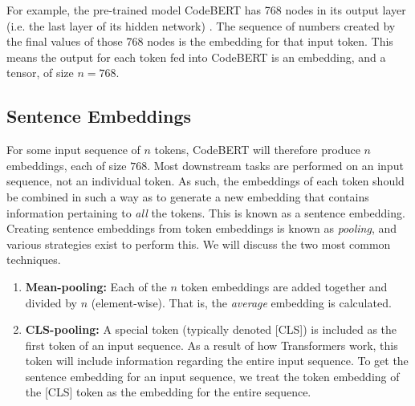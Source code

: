 \noindent
For example, the pre-trained model CodeBERT has 768 nodes in its output layer (i.e. the last layer of its hidden network) \cite{CodeBERT}. The sequence of numbers created by the final values of those 768 nodes is the embedding for that input token. This means the output for each token fed into CodeBERT is an embedding, and a tensor, of size $n = 768$.\\


\subsection{Sentence Embeddings}
\label{embedding}
\noindent
For some input sequence of $n$ tokens, CodeBERT will therefore produce $n$ embeddings, each of size $768$. Most downstream tasks are performed on an input sequence, not an individual token. As such, the embeddings of each token should be combined in such a way as to generate a new embedding that contains information pertaining to \emph{all} the tokens. This is known as a sentence embedding. Creating sentence embeddings from token embeddings is known as \emph{pooling}, and various strategies exist to perform this. We will discuss the two most common techniques.

\begin{enumerate}
    \item \textbf{Mean-pooling:} Each of the $n$ token embeddings are added together and divided by $n$ (element-wise). That is, the \emph{average} embedding is calculated. 
  
    \item \textbf{CLS-pooling:} A special token (typically denoted [CLS]) is included as the first token of an input sequence. As a result of how Transformers work, this token will include information regarding the entire input sequence. To get the sentence embedding for an input sequence, we treat the token embedding of the [CLS] token as the embedding for the entire sequence.
\end{enumerate}

